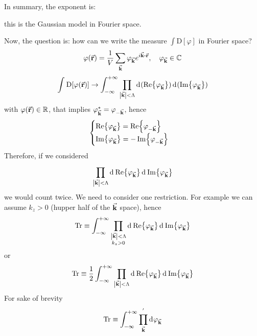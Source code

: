 \documentclass[../main/main.tex]{subfiles}
\begin{document}
In summary, the exponent is:
this is the Gaussian model in Fourier space.

Now, the question is: how can we write the measure \( \int \text{D}[\varphi ] \) in Fourier space?
\begin{equation}
  \varphi (\va{r}) = \frac{1}{V} \sum_{\va{k}}^{} \varphi _{\va{k}} e^{i \va{k} \vdot \va{r}}, \quad \varphi _{\va{k}} \in \mathbb{C}
\end{equation}
\begin{equation}
  \int_{}^{} \text{D} \qty[\varphi (\va{r})] \rightarrow \int_{- \infty }^{+ \infty } \prod_{\abs{\va{k}} < \Lambda  }^{}   \dd[]{(\Re{\varphi _{\va{k}}})}   \dd[]{(\Im{\varphi _{\va{k}}})}
\end{equation}
with \( \varphi (\va{r}) \in \mathbb{R} \), that implies \(    \varphi _{\va{k}}^* = \varphi _{-\va{k}}\), hence
\begin{equation}
  \begin{cases}
   \Re {\varphi _{\va{k}}} = \Re {\varphi _{-\va{k}}} \\
  \Im{\varphi _{\va{k}}} = -\Im {\varphi _{-\va{k}}}
  \end{cases}
\end{equation}
Therefore, if we considered
\begin{equation}
  \prod_{\abs{\va{k}} < \Lambda  }^{} \dd[]{\Re {\varphi _{\va{k}}}} \dd[]{\Im{\varphi _{\va{k}}}}
\end{equation}
we would count twice. We need to consider one restriction. For example we can assume
\( k_z > 0 \) (hupper half of the \( \va{k} \) space), hence
\begin{equation}
  \Tr \equiv \int_{- \infty }^{+ \infty } \prod_{\substack{ \abs{\va{k}} < \Lambda   \\ k_z > 0 } }^{}   \dd[]{\Re {\varphi _{\va{k}}}}  \dd[]{\Im {\varphi _{\va{k}}}}
\end{equation}
or
\begin{equation}
  \Tr \equiv \frac{1}{2} \int_{- \infty }^{+ \infty } \prod_{\substack{ \abs{\va{k}} < \Lambda    } }^{}   \dd[]{\Re {\varphi _{\va{k}}}}  \dd[]{\Im {\varphi _{\va{k}}}}
\end{equation}
For sake of brevity
\begin{equation}
  \Tr \equiv \int_{-\infty }^{+\infty } \prod_{\va{k}}^{'}  \dd[]{\varphi _{\va{k}}}
\end{equation}
\end{document}
